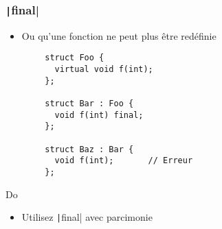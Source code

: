 \documentclass[C++.tex]{subfiles}
\begin{document}
\begin{frame}[fragile]
	\frametitle{\texttt|final|}
	\begin{itemize}
		\item Ou qu'une fonction ne peut plus être redéfinie
	\end{itemize}

	\begin{verbatim}
		struct Foo {
		  virtual void f(int);
		};

		struct Bar : Foo {
		  void f(int) final;
		};

		struct Baz : Bar {
		  void f(int);       // Erreur
		};
	\end{verbatim}

	\begin{exampleblock}{Do}
		\begin{itemize}
			\item Utilisez \texttt|final| avec parcimonie
		\end{itemize}
	\end{exampleblock}


\end{frame}
\end{document}
